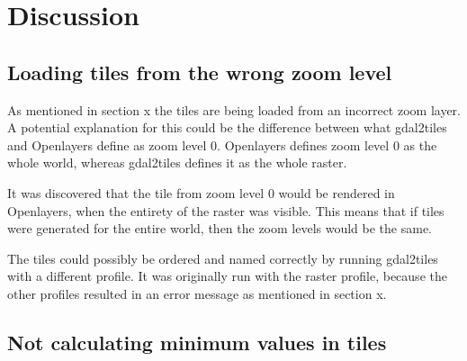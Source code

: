\chapter{Discussion}


\section{Loading tiles from the wrong zoom level}\label{WhyWrongLevel}

As mentioned in section x the tiles are being loaded from an incorrect zoom layer. A potential explanation for this could be the difference between what gdal2tiles and Openlayers define as zoom level 0. Openlayers defines zoom level 0 as the whole world, whereas gdal2tiles defines it as the whole raster. 

It was discovered that the tile from zoom level 0 would be rendered in Openlayers, when the entirety of the raster was visible. This means that if tiles were generated for the entire world, then the zoom levels would be the same. 

The tiles could possibly be ordered and named correctly by running gdal2tiles with a different profile.  It was originally run with the raster profile, because the other profiles resulted in an error message as mentioned in section x. 

\section{Not calculating minimum values in tiles} \label{WhyNoMin}

